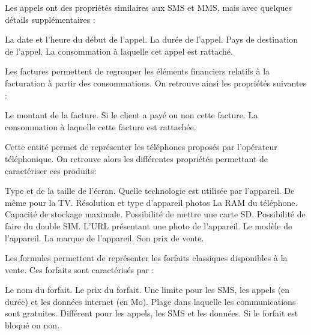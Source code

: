 Les appels ont des propriétés similaires aux SMS et MMS, mais avec quelques détails supplémentaires :
\begin{multicols}{2}
  \begin{itemize}
    La date et l'heure du début de l'appel.
    La durée de l'appel.
    Pays de destination de l'appel.
    La consommation à laquelle cet appel est rattaché.
  \end{itemize}
\end{multicols}

Les factures permettent de regrouper les éléments financiers relatifs à la facturation à partir des consommations. On retrouve ainsi les propriétés suivantes :
\begin{multicols}{2}
  \begin{itemize}
    Le montant de la facture.
    Si le client a payé ou non cette facture.
    La consommation à laquelle cette facture est rattachée.
  \end{itemize}
\end{multicols}

Cette entité permet de représenter les téléphones proposés par l'opérateur téléphonique. On retrouve alors les différentes propriétés permettant de caractériser ces produits:
\begin{multicols}{2}
  \begin{itemize}
    Type et de la taille de l'écran.
    Quelle technologie est utilisée par l'appareil.
    De même pour la TV.
    Résolution et type d'appareil photos
    La RAM du téléphone.
    Capacité de stockage maximale.
    Possibilité de mettre une carte SD.
    Possibilité de faire du double SIM.
    L'URL présentant une photo de l'appareil.
    Le modèle de l'appareil.
    La marque de l'appareil.
    Son prix de vente.
  \end{itemize}
\end{multicols}

Les formules permettent de représenter les forfaits \og classiques\fg{} disponibles à la vente. Ces forfaits sont caractérisés par :
\begin{multicols}{2}
  \begin{itemize}
    Le nom du forfait.
    Le prix du forfait.
    Une limite pour les SMS, les appels (en durée) et les données internet (en Mo).
    Plage dans laquelle les communications sont gratuites.
    Différent pour les appels, les SMS et les données.
    Si le forfait est bloqué ou non.
  \end{itemize}
\end{multicols}

